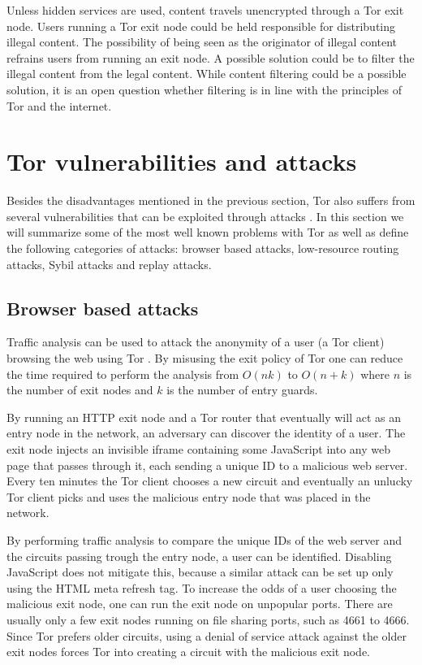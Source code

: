 \documentclass{article}
\begin{document}
			Unless hidden services are used, content travels unencrypted through a Tor exit node. Users running a Tor exit node could be held responsible for distributing illegal content. The possibility of being seen as the originator of illegal content refrains users from running an exit node. A possible solution could be to filter the illegal content from the legal content. While content filtering could be a possible solution, it is an open question whether filtering is in line with the principles of Tor and the internet.
		
\section{Tor vulnerabilities and attacks}
	\label{sec:attacks}
	
	Besides the disadvantages mentioned in the previous section, Tor also suffers from several vulnerabilities that can be exploited through attacks \cite{abbott2007browser, douceur2002sybil, bauer2007low}. In this section we will summarize some of the most well known problems with Tor as well as define the following categories of attacks: browser based attacks, low-resource routing attacks, Sybil attacks and replay attacks.

	\subsection{Browser based attacks}
		Traffic analysis can be used to attack the anonymity of a user (a Tor client) browsing the web using Tor \cite{abbott2007browser}. By misusing the exit policy of Tor one can reduce the time required to perform the analysis from $O(nk)$ to $O(n+k)$ where $n$ is the number of exit nodes and $k$ is the number of entry guards.

		By running an HTTP exit node and a Tor router that eventually will act as an entry node in the network, an adversary can discover the identity of a user. The exit node injects an invisible iframe containing some JavaScript into any web page that passes through it, each sending a unique ID to a malicious web server. Every ten minutes the Tor client chooses a new circuit and eventually an unlucky Tor client picks and uses the malicious entry node that was placed in the network.

		By performing traffic analysis to compare the unique IDs of the web server and the circuits passing trough the entry node, a user can be identified. Disabling JavaScript does not mitigate this, because a similar attack can be set up only using the HTML meta refresh tag. To increase the odds of a user choosing the malicious exit node, one can run the exit node on unpopular ports. There are usually only a few exit nodes running on file sharing ports, such as 4661 to 4666. Since Tor prefers older circuits, using a denial of service attack against the older exit nodes forces Tor into creating a circuit with the malicious exit node.
\end{document}
